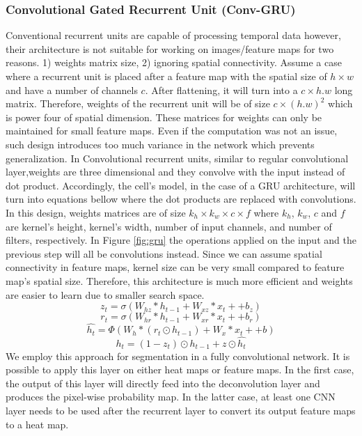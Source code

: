 \documentclass{article}
\begin{document}
\subsubsection{Convolutional Gated Recurrent Unit (Conv-GRU)}
Conventional recurrent units are capable of processing temporal data however, their architecture is not suitable for working on images/feature maps for two reasons. 1) weights matrix size, 2) ignoring spatial connectivity. Assume a case where a recurrent unit is placed after a feature map with the spatial size of $h\times w$ and have a number of channels $c$. After flattening, it will turn into a $c\times h.w$ long matrix. Therefore, weights of the recurrent unit will be of size $c\times (h.w)^2$ which is power four of spatial dimension. These matrices for weights can only be maintained for small feature maps. Even if the computation was not an issue, such design introduces too much variance in the network which prevents generalization. In Convolutional recurrent units, similar to regular convolutional layer,weights are three dimensional and they convolve with the input instead of dot product. Accordingly, the cell’s model, in the case of a GRU architecture, will turn into equations bellow where the dot products are replaced with convolutions. In this design, weights matrices are of size $k_h \times k_w \times c \times f$ where $k_h$, $k_w$, $c$ and $f$ are kernel’s height, kernel’s width, number of input channels, and number of filters, respectively. In Figure \ref{fig:gru} the operations applied on the input and the previous step will all be convolutions instead. Since we can assume spatial connectivity in feature maps, kernel size can be very small compared to feature map’s spatial size. Therefore, this architecture is much more efficient and weights are easier to learn due to smaller search space.
$$z_t = \sigma(W_{hz} * h_{t-1} + W_{xz} * x_t+ +b_z)$$
$$r_t = \sigma(W_{hr} * h_{t-1} + W_{xr} * x_t+ +b_r)$$
$$\hat{h_t} = \Phi (W_{h} * ( r_t \odot h_{t-1}) + W_x * x_t+ +b)$$
$$h_t = (1-z_t)\odot h_{t-1} + z \odot \hat{h_t}$$
We employ this approach for segmentation in a fully convolutional network. It is possible to apply this layer on either heat maps or feature maps. In the first case, the output of this layer will directly feed into the deconvolution layer and produces the pixel-wise probability map. In the latter case, at least one CNN layer needs to be used after the recurrent layer to convert its output feature maps to a heat map.
\end{document}
